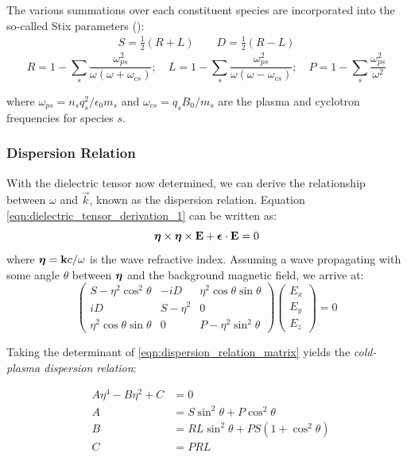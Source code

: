 The various summations over each constituent species are incorporated into the so-called Stix parameters (\cite{Stix1992}):
\begin{eqnarray}
S =\frac{1}{2}(R + L) \qquad D = \frac{1}{2}(R - L)
\label{eqn:stix_params_1}
\end{eqnarray}
\begin{equation}
R = 1 - \sum_s\frac{\omega_{ps}^2}{\omega(\omega + \omega_{cs})}; \quad L = 1 - \sum_s\frac{\omega_{ps}^2}{\omega(\omega - \omega_{cs})}; \quad P = 1 - \sum_s\frac{\omega_{ps}^2}{\omega^2}
\label{eqn:stix_params_2}
\end{equation}

where $\omega_{ps} = n_sq_s^2/{\epsilon_0 m_s}$ and $\omega_{cs}=q_sB_0/m_s$ are the plasma and cyclotron frequencies for species $s$.

\subsubsection{Dispersion Relation}
With the dielectric tensor now determined, we can derive the relationship between $\omega$ and $\vec{k}$, known as the dispersion relation. Equation \ref{eqn:dielectric_tensor_derivation_1} can be written as:
\begin{equation}
\boldsymbol{\eta}\times \boldsymbol{\eta} \times \mathbf{E} +  \boldsymbol{\epsilon}\cdot\mathbf{E} = 0
\end{equation}
where $\boldsymbol{\eta} = \mathbf{k}c/\omega$ is the wave refractive index. Assuming a wave propagating with some angle $\theta$ between $\boldsymbol{\eta}$ and the background magnetic field, we arrive at:
\begin{equation}
\begin{pmatrix}
S - \eta^2\cos^2\theta & -iD & \eta^2\cos{\theta}\sin{\theta} \\
iD & S - \eta^2 & 0 \\
\eta^2\cos{\theta}\sin{\theta} & 0 & P - \eta^2\sin^2{\theta} \end{pmatrix}\begin{pmatrix}E_x \\ E_y \\ E_z\end{pmatrix} = 0
\label{eqn:dispersion_relation_matrix}
\end{equation}

Taking the determinant of \ref{eqn:dispersion_relation_matrix} yields the \emph{cold-plasma dispersion relation}:

\begin{eqnarray}
&A\eta^4 - B\eta^2 + C &= 0 \label{eqn:disp_rln}  \\
&A& = S \sin^2\theta + P\cos^2\theta \\
&B& = RL\sin^2\theta + PS(1 + \cos^2\theta) \\
&C& = PRL
\end{eqnarray}


